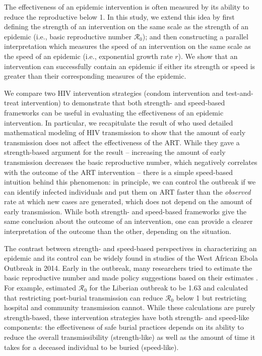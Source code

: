 \documentclass[12pt]{article}
\begin{document}
The effectiveness of an epidemic intervention is often measured by its ability to reduce the reproductive below 1.
In this study, we extend this idea by first defining the strength of an intervention on the same scale as the strength of an epidemic (i.e., basic reproductive number $\mathcal R_0$); and then constructing a parallel interpretation which measures the speed of an intervention on the same scale as the speed of an epidemic (i.e., exponential growth rate $r$).
We show that an intervention can successfully contain an epidemic if either its strength or speed is greater than their corresponding measures of the epidemic.

We compare two HIV intervention strategies (condom intervention and test-and-treat intervention) to demonstrate that both strength- and speed-based frameworks can be useful in evaluating the effectiveness of an epidemic intervention.
In particular, we recapitulate the result of \cite{eaton2014proportion} who used detailed mathematical modeling of HIV transmission to show that the amount of early transmission does not affect the effectiveness of the ART.
While they gave a strength-based argument for the result --  increasing the amount of early transmission decreases the basic reproductive number, which negatively correlates with the outcome of the ART intervention \citep{eaton2014proportion} -- there is a simple speed-based intuition behind this phenomenon: in principle, we can control the outbreak if we can identify infected individuals and put them on ART faster than the \emph{observed} rate at which new cases are generated, which does not depend on the amount of early transmission.
While both strength- and speed-based frameworks give the same conclusion about the outcome of an intervention, one can provide a clearer interpretation of the outcome than the other, depending on the situation.

The contrast between strength- and speed-based perspectives in characterizing an epidemic and its control can be widely found in studies of the West African Ebola Outbreak in 2014.
Early in the outbreak, many researchers tried to estimate the basic reproductive number and made policy suggestions based on their estimates \citep{althaus2014estimating, fisman2014early, gomes2014assessing, pandey2014strategies, shaman2014inference, towers2014temporal, who2014ebola}.
For example, \cite{pandey2014strategies} estimated $\mathcal R_0$ for the Liberian outbreak to be 1.63 and calculated that restricting post-burial transmission can reduce $\mathcal R_0$ below 1 but restricting hospital and community transmission cannot.
While these calculations are purely strength-based, these intervention strategies have both strength- and speed-like components: the effectiveness of safe burial practices depends on its ability to reduce the overall transmissibility (strength-like) as well as the amount of time it takes for a deceased individual to be buried (speed-like).
\end{document}
